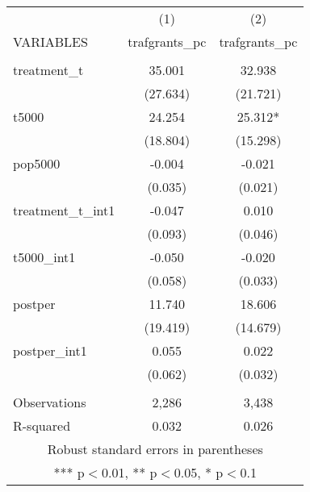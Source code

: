 \documentclass[]{article}
\begin{document}
\begin{tabular}{lcc} \hline
 & (1) & (2) \\
VARIABLES & trafgrants\_pc & trafgrants\_pc \\ \hline
 &  &  \\
treatment\_t & 35.001 & 32.938 \\
 & (27.634) & (21.721) \\
t5000 & 24.254 & 25.312* \\
 & (18.804) & (15.298) \\
pop5000 & -0.004 & -0.021 \\
 & (0.035) & (0.021) \\
treatment\_t\_int1 & -0.047 & 0.010 \\
 & (0.093) & (0.046) \\
t5000\_int1 & -0.050 & -0.020 \\
 & (0.058) & (0.033) \\
postper & 11.740 & 18.606 \\
 & (19.419) & (14.679) \\
postper\_int1 & 0.055 & 0.022 \\
 & (0.062) & (0.032) \\
 &  &  \\
Observations & 2,286 & 3,438 \\
 R-squared & 0.032 & 0.026 \\ \hline
\multicolumn{3}{c}{ Robust standard errors in parentheses} \\
\multicolumn{3}{c}{ *** p$<$0.01, ** p$<$0.05, * p$<$0.1} \\
\end{tabular}
\end{document}
